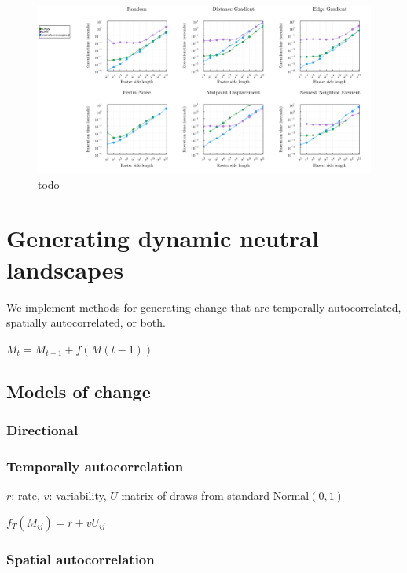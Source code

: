 \documentclass[11pt]{article}
\makeatletter
\def\maxwidth{\ifdim\Gin@nat@width>\linewidth\linewidth
\else\Gin@nat@width\fi}
\let\Oldincludegraphics\includegraphics
\renewcommand{\includegraphics}[1]{\Oldincludegraphics[width=\maxwidth]{#1}}
\makeatother
\begin{document}
\begin{figure}
\centering
\includegraphics{./figures/benchmark.png}
\caption{todo}
\end{figure}

\hypertarget{generating-dynamic-neutral-landscapes}{%
\section{Generating dynamic neutral
landscapes}\label{generating-dynamic-neutral-landscapes}}

We implement methods for generating change that are temporally
autocorrelated, spatially autocorrelated, or both.

\(M_t = M_{t-1} + f(M(t-1))\)

\hypertarget{models-of-change}{%
\subsection{Models of change}\label{models-of-change}}

\hypertarget{directional}{%
\subsubsection{Directional}\label{directional}}

\hypertarget{temporally-autocorrelation}{%
\subsubsection{Temporally
autocorrelation}\label{temporally-autocorrelation}}

\(r\): rate, \(v\): variability, \(U\) matrix of draws from standard
\(\text{Normal}(0,1)\)

\(f_{T}(M_{ij}) = r + vU_{ij}\)

\hypertarget{spatial-autocorrelation}{%
\subsubsection{Spatial autocorrelation}\label{spatial-autocorrelation}}
\end{document}
